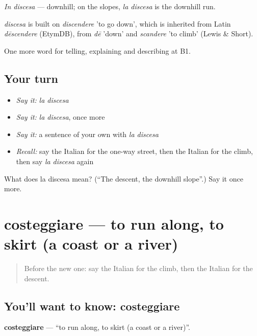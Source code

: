 \emph{In discesa} — downhill; on the slopes, \emph{la discesa} is the downhill run.

\begin{cousinweb}
\emph{discesa} is built on \emph{discendere} 'to go down', which is inherited from Latin \emph{dēscendere} (EtymDB), from \emph{dē} 'down' and \emph{scandere} 'to climb' (Lewis \& Short).
\end{cousinweb}

\begin{grammarlens}[title={What you've built}]
One more word for telling, explaining and describing at B1.
\end{grammarlens}

\subsection*{Your turn}
\begin{itemize}
\raggedright
  \item \emph{Say it:} \emph{la discesa}
  \item \emph{Say it:} \emph{la discesa}, once more
  \item \emph{Say it:} a sentence of your own with \emph{la discesa}
  \item \emph{Recall:} say the Italian for the one-way street, then the Italian for the climb, then say \emph{la discesa} again
\end{itemize}

\begin{tcolorbox}[breakable,colback=teal!4,colframe=teal!35!black,title={Before you move on}]
What does la discesa mean? (\textquotedblleft{}The descent, the downhill slope\textquotedblright{}.) Say it once more.
\end{tcolorbox}
\section[costeggiare]{costeggiare — to run along, to skirt (a coast or a river)}

\label{lesson:IT-C442-costeggiare}



\begin{quote}
Before the new one: say the Italian for the climb, then the Italian for the descent.
\end{quote}

\subsection*{You'll want to know: costeggiare}
\textbf{costeggiare} — \textquotedblleft{}to run along, to skirt (a coast or a river)\textquotedblright{}.

